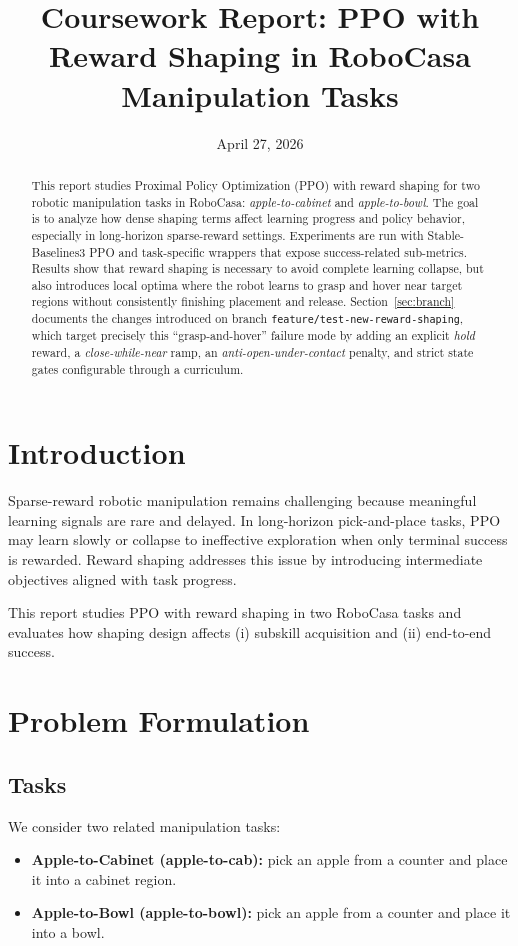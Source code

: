 \documentclass[11pt]{article}
\title{Coursework Report: PPO with Reward Shaping in RoboCasa Manipulation Tasks}
\date{April 27, 2026}
\begin{document}
\maketitle

\begin{abstract}
This report studies Proximal Policy Optimization (PPO) with reward shaping for two
robotic manipulation tasks in RoboCasa: \emph{apple-to-cabinet} and \emph{apple-to-bowl}.
The goal is to analyze how dense shaping terms affect learning progress and policy
behavior, especially in long-horizon sparse-reward settings. Experiments are run with
Stable-Baselines3 PPO and task-specific wrappers that expose success-related sub-metrics.
Results show that reward shaping is necessary to avoid complete learning collapse, but
also introduces local optima where the robot learns to grasp and hover near target
regions without consistently finishing placement and release. Section~\ref{sec:branch}
documents the changes introduced on branch
\texttt{feature/test-new-reward-shaping}, which target precisely this
``grasp-and-hover'' failure mode by adding an explicit \emph{hold} reward, a
\emph{close-while-near} ramp, an \emph{anti-open-under-contact} penalty, and strict
state gates configurable through a curriculum.
\end{abstract}

\section{Introduction}
Sparse-reward robotic manipulation remains challenging because meaningful learning
signals are rare and delayed. In long-horizon pick-and-place tasks, PPO may learn
slowly or collapse to ineffective exploration when only terminal success is rewarded.
Reward shaping addresses this issue by introducing intermediate objectives aligned
with task progress.

This report studies PPO with reward shaping in two RoboCasa tasks and evaluates how
shaping design affects (i) subskill acquisition and (ii) end-to-end success.

\section{Problem Formulation}

\subsection{Tasks}
We consider two related manipulation tasks:
\begin{itemize}
  \item \textbf{Apple-to-Cabinet (apple-to-cab):} pick an apple from a counter and
    place it into a cabinet region.
  \item \textbf{Apple-to-Bowl (apple-to-bowl):} pick an apple from a counter and
    place it into a bowl.
\end{itemize}
\end{document}
